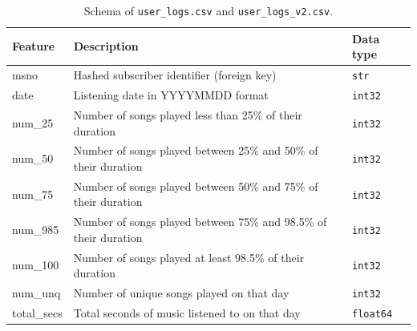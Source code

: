 \documentclass{article}
\begin{document}
\begin{table}[H]
\centering
\renewcommand{\arraystretch}{1.3}
\begin{tabularx}{\textwidth}{|l|X|l|}
\hline
\textbf{Feature} & \textbf{Description} & \textbf{Data type} \\ \hline
msno        & Hashed subscriber identifier (foreign key) & \texttt{str} \\ \hline
date        & Listening date in YYYYMMDD format & \texttt{int32} \\ \hline
num\_25     & Number of songs played less than 25\% of their duration & \texttt{int32} \\ \hline
num\_50     & Number of songs played between 25\% and 50\% of their duration & \texttt{int32} \\ \hline
num\_75     & Number of songs played between 50\% and 75\% of their duration & \texttt{int32} \\ \hline
num\_985    & Number of songs played between 75\% and 98.5\% of their duration & \texttt{int32} \\ \hline
num\_100    & Number of songs played at least 98.5\% of their duration & \texttt{int32} \\ \hline
num\_unq    & Number of unique songs played on that day & \texttt{int32} \\ \hline
total\_secs & Total seconds of music listened to on that day & \texttt{float64} \\ \hline
\end{tabularx}
\caption{Schema of \texttt{user\_logs.csv} and \texttt{user\_logs\_v2.csv}.}
\label{tab:w2_schema_logs}
\end{table}
\end{document}
